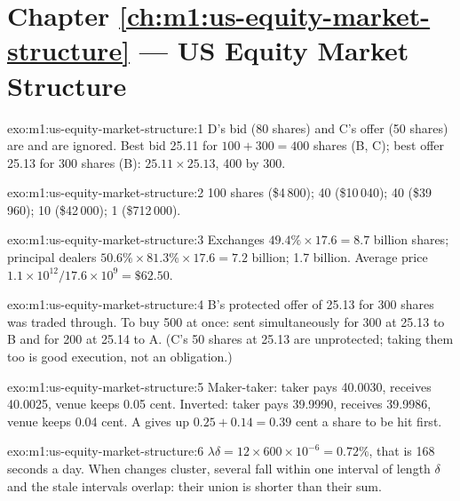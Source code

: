\section*{Chapter \ref{ch:m1:us-equity-market-structure} --- US Equity Market Structure}

\begin{solution}{exo:m1:us-equity-market-structure:1}
D's bid (80 shares) and C's offer (50 shares) are  and are ignored.
Best bid 25.11 for $100 + 300 = 400$ shares (B, C); best offer 25.13 for 300
shares (B): $25.11 \times 25.13$, 400 by 300.
\end{solution}

\begin{solution}{exo:m1:us-equity-market-structure:2}
100 shares (\$4\,800); 40 (\$10\,040); 40 (\$39\,960); 10 (\$42\,000); 1
(\$712\,000).
\end{solution}

\begin{solution}{exo:m1:us-equity-market-structure:3}
Exchanges $49.4\% \times 17.6 = 8.7$ billion shares; principal dealers
$50.6\% \times 81.3\% \times 17.6 = 7.2$ billion; 
1.7 billion. Average price $1.1\times10^{12}/17.6\times10^9 = \$62.50$.
\end{solution}

\begin{solution}{exo:m1:us-equity-market-structure:4}
B's protected offer of 25.13 for 300 shares was traded through. To buy 500 at
once:  sent simultaneously for 300 at 25.13 to B and
for 200 at 25.14 to A. (C's 50 shares at 25.13 are unprotected; taking them
too is good execution, not an obligation.)
\end{solution}

\begin{solution}{exo:m1:us-equity-market-structure:5}
Maker-taker: taker pays 40.0030,  receives 40.0025, venue keeps 0.05
cent. Inverted: taker pays 39.9990,  receives 39.9986, venue keeps 0.04
cent. A  gives up $0.25 + 0.14 = 0.39$ cent a share to be hit first.
\end{solution}

\begin{solution}{exo:m1:us-equity-market-structure:6}
$\lambda\delta = 12 \times 600\times10^{-6} = 0.72\%$, that is 168 seconds a
day. When changes cluster, several fall within one interval of length
$\delta$ and the stale intervals overlap: their union is shorter than their
sum.
\end{solution}

